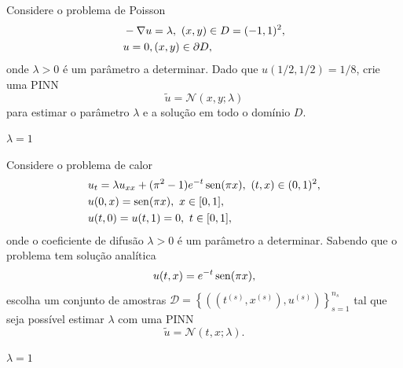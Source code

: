 \begin{ex}
  Considere o problema de Poisson{\poisson}
  \begin{subequations}
    \begin{align}
      &-\nabla u = \lambda, ~(x,y)\in D=(-1,1)^2,\\
      &u = 0, (x,y)\in\partial D,        
    \end{align}
  \end{subequations}
  onde $\lambda > 0$ é um parâmetro a determinar. Dado que $u(1/2,1/2) = 1/8$, crie uma PINN 
  \begin{equation}
    \tilde{u} = \mathcal{N}(x,y;\lambda)
  \end{equation}
  para estimar o parâmetro $\lambda$ e a solução em todo o domínio $D$.
\end{ex}
\begin{resp}
  $\lambda = 1$
\end{resp}

\begin{ex}
  Considere o problema de calor
  \begin{subequations}
    \begin{align}
      &u_t = \lambda u_{xx} + (\pi^2-1)e^{-t}\operatorname{sen}(\pi x), ~(t,x)\in(0,1)^2,\\
      &u(0,x) = \operatorname{sen}(\pi x), ~x\in[0,1],\\
      &u(t,0) = u(t,1) = 0, ~t\in[0,1],
    \end{align}
  \end{subequations}
  onde o coeficiente de difusão $\lambda>0$ é um parâmetro a determinar. Sabendo que o problema tem solução analítica
  \begin{equation}
    u(t,x) = e^{-t}\operatorname{sen}(\pi x),
  \end{equation}
  escolha um conjunto de amostras $\mathcal{D} = \left\{\left(\left(t^{(s)},x^{(s)}\right),u^{(s)}\right)\right\}_{s=1}^{n_s}$ tal que seja possível estimar $\lambda$ com uma PINN
  \begin{equation}
    \tilde{u} = \mathcal{N}(t,x;\lambda).
  \end{equation}
\end{ex}
\begin{resp}
  $\lambda = 1$
\end{resp}

